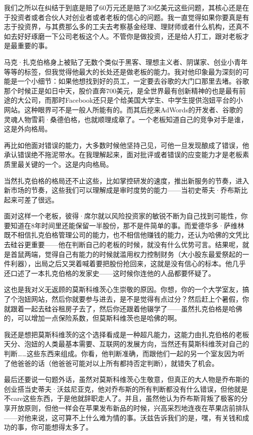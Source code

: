 我们之所以在纠结于到底是赔了60万元还是赔了30亿美元这些问题，其核心还是在于投资者或者合伙人对创业者或者老板的信心的问题。我一直觉得如果你要真是有志于投资界，与其费那么多的工夫去考察基金经理、理财师或者什么机构，还真不如去好好琢磨一下公司老板这个人。不管你是做投资，还是给人打工，跟对老板才是最重要的事。

马克·扎克伯格身上被贴了无数个类似于黑客、理想主义者、阴谋家、创业小青年等等的标签，但我觉得他最大的长处还是做老板的能力。我对他印象最为深刻的可能是一个小细节：如果他想找到好的员工，一定要去谷歌的大门口那里去堵。谷歌那个时候正是如日中天，股价直奔700美元，是全世界最有创新精神的也是最有前途的大公司，而那时Facebook还只是个给美国大学生、中学生提供泡妞平台的小网站。这种眼界可不是一般人所能有的。而其后挖来AdWords的开发者、谷歌的灵魂人物雪莉·桑德伯格，也就顺理成章了。一个老板知道自己的竞争对手是谁，这是外向格局。

再比如他面对错误的能力，大多数时候他坚持己见，可他一旦发现酿成了错误，他承认错误绝不拖泥带水。在我理解起来，面对批评或者错误的应变能力才是老板素质里最关键的一个。这是内向格局。

当然扎克伯格的格局还不止这些，比如掌控研发的速度，推出新服务的节奏，进入新市场的节奏，这些我们可以理解成是审时度势的能力------当初史蒂夫·乔布斯比起来可差了很远。

面对这样一个老板，彼得·席尔就以风险投资家的敏锐不断为自己找到可能性，你要知道在8年时间里还能保留一半股份，那不是件简单的事。而爱德华多·萨维林既不相信扎克伯格管理公司的能力，也不相信他赚钱的能力，还认为哈佛的文凭比去硅谷更重要------他在判断自己的老板的时候，就没有什么优势可言。结果呢，就是首鼠两端，觉得自己有能力的时候就滥用权力控制财务（大小股东最爱祭起的一件利器），出局之后又哭着喊着要把股份抢回来，这就是没有信心的标本。他几乎还口述了一本扎克伯格的发家史------这时候你连他的人品都要怀疑了。

这也是我对义无返顾的莫斯科维茨心生崇敬的原因。你想，你的一个大学室友，搞了个泡妞网站，然后你就要参与进去，是不是觉得有点过分？然后赶上个暑假，你就跟着一起去硅谷租房子去了，然后你还跟着他辍学了------虽然扎克伯格是哈佛的，可以增加一点保险系数，但莫斯科维茨也是哈佛的啊。

我还是想把莫斯科维茨的这个选择看成是一种超凡能力，这能力由扎克伯格的老板天分、泡妞的人类最基本需要、互联网的发展方向，当然还有莫斯科维茨对自己的判断\ldots\ldots 这些东西来组成。你看，他判断准确，而跟他们一起的另一个室友因为听了他爸爸的话（他爸爸可能对以上所有都持否定判断），就错失了机会。

最后还要说一句题外话，虽然对莫斯科维茨心生敬意，但真正的大人物是乔布斯的创业搭当史蒂夫·沃兹尼亚克，他对乔布斯的所有判断都没有什么错误，但他就是不care这些东西，于是他就辞职走人了。并且，虽然他认为乔布斯背叛了极客的分享开放原则，但他一样会在苹果发布新品的时候，兴高采烈地连夜在苹果店前排队------对他来说，这可算不上什么难为情的事。沃兹告诉我们的是，嘿，有关钱和成功的事，你可能想得太多了。

